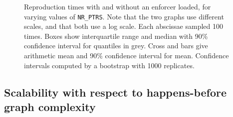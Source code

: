 \begin{figure}
  \caption{Reproduction times with and without an enforcer loaded, for
    varying values of \texttt{NR\_PTRS}.  Note that the two graphs use
    different scales, and that both use a log scale.  Each abscissae
    sampled 100 times.  Boxes show interquartile range and median with
    90\% confidence interval for quantiles in grey.  Cross and bars
    give arithmetic mean and 90\% confidence interval for mean.
    Confidence intervals computed by a bootstrap with 1000
    replicates. }
  \label{fig:eval:indexed_toctou:nr_ptrs}
\end{figure}

\subsection{Scalability with respect to happens-before graph complexity}

